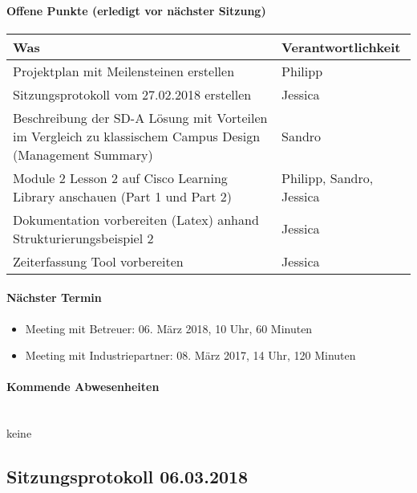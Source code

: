 \paragraph{Offene Punkte (erledigt vor nächster Sitzung)} \mbox{}
\begin{table}[H]
	\centering
	\begin{tabularx}{\textwidth}{X | p{4.5cm}}
		\rowcolor{gray!50}
		\textbf{Was} & \textbf{Verantwortlichkeit} \\
		\hline	
		Projektplan mit Meilensteinen erstellen	& Philipp \\	
		Sitzungsprotokoll vom 27.02.2018 erstellen & Jessica \\
		Beschreibung der SD-A Lösung mit Vorteilen im Vergleich zu klassischem Campus Design (Management Summary) &	Sandro \\
		Module 2 Lesson 2 auf Cisco Learning Library anschauen (Part 1 und Part 2) & Philipp, Sandro, Jessica \\
		Dokumentation vorbereiten (Latex) anhand Strukturierungsbeispiel 2 & Jessica \\
		Zeiterfassung Tool vorbereiten & Jessica \\	
	\end{tabularx}
	\label{tab:my-label}
\end{table}

\paragraph{Nächster Termin}
\begin{itemize}	
	\item Meeting mit Betreuer: 06. März 2018, 10 Uhr, 60 Minuten
	\item Meeting mit Industriepartner: 08. März 2017, 14 Uhr, 120 Minuten
\end{itemize}

\paragraph{Kommende Abwesenheiten} \mbox{}\\
keine

\newpage





\subsection{Sitzungsprotokoll 06.03.2018}

